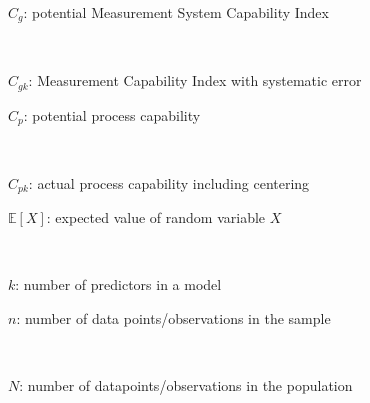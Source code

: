 \documentclass[
  a4paper,
]{scrbook}
\begin{document}
\begin{figure}

\begin{minipage}{0.47\linewidth}
\label{Cg}{\(C_g\)}: potential Measurement System
Capability Index\end{minipage}%
%
\begin{minipage}{0.05\linewidth}
~\end{minipage}%
%
\begin{minipage}{0.47\linewidth}
\label{Cgk}{\(C_{gk}\)}: Measurement Capability Index
with systematic error\end{minipage}%
\newline
\begin{minipage}{0.47\linewidth}
\label{Cp}{\(C_p\)}: potential process
capability\end{minipage}%
%
\begin{minipage}{0.05\linewidth}
~\end{minipage}%
%
\begin{minipage}{0.47\linewidth}
\label{Cpk}{\(C_{pk}\)}: actual process capability
including centering\end{minipage}%
\newline
\begin{minipage}{0.47\linewidth}
\label{expected-value-gloss}{\(\mathbb{E}[X]\)}: expected
value of random variable \(X\)\end{minipage}%
%
\begin{minipage}{0.05\linewidth}
~\end{minipage}%
%
\begin{minipage}{0.47\linewidth}
\label{numpred}{\(k\)}: number of predictors in a
model\end{minipage}%
\newline
\begin{minipage}{0.47\linewidth}
\label{n-gloss}{\(n\)}: number of data
points/observations in the sample\end{minipage}%
%
\begin{minipage}{0.05\linewidth}
~\end{minipage}%
%
\begin{minipage}{0.47\linewidth}
\label{N-gloss}{\(N\)}: number of datapoints/observations
in the population\end{minipage}%
\newline
\begin{minipage}{0.47\linewidth}

\end{minipage}
\end{figure}
\end{document}
